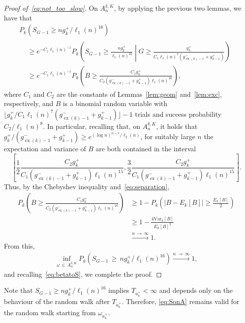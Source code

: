 \documentclass[AHL,Unicode,longabstracts,published]{cedram}
\newcommand{\relmiddle}[1]{\mathrel{}\middle#1\mathrel{}}
\newcommand{\cond}{\relmiddle{|}}
\newcommand{\Pk}{{P_k}}
\newcommand{\Ek}{{E_k}}
\newcommand\ex{\operatorname{ex}}
\newcommand{\gtt}[1]{g_{\ex(#1)-1}^-}
\begin{document}
\begin{proof}[Proof of~\eqref{eq:not_too_slow}]
On $A_n^{\delta,K}$, by applying the previous two lemmas, we have that
\begin{multline*}
\Pk\left(S_{G-1}\geq ng_k^+/\ell_1(n)^{16}\right)\\
\begin{aligned}
&\geq e^{-C_1\ell_1(n)^{-1}}\Pk\left(S_{G-1}\geq \frac{ng_k^+}{\ell_1(n)^{16}}\cond G\geq \frac{g_{k}^+}{C_1 \ell_1(n)^7\left(\gtt{k}+g_{k-1}^+\right)}\right)\\
&\geq e^{-C_1\ell_1(n)^{-1}}\Pk\left(B\geq \frac{C_1g_k^+}{C_2\left(\gtt{k}+g_{k-1}^+\right)\ell_1(n)^{16}}\right),
\end{aligned}
\end{multline*}
where $C_1$ and $C_2$ are the constants of Lemmas~\ref{lem:geom} and~\ref{lem:exc}, respectively, and $B$ is a binomial random variable with $\lfloor g_{k}^+ /C_1 \ell_1(n)^7(\gtt{k}+g_{k-1}^+)\rfloor-1$ trials and success probability ${C_2}/{\ell_1(n)^{8}}$. In particular, recalling that, on $A_n^{\delta,K}$, it holds that ${g_{k}^+}/(\gtt{k}+g_{k-1}^+)\geq e^{(\log n)^{\alpha-1}/\ell_2(n)}$, for suitably large $n$ the expectation and variance of $B$ are both contained in the interval
\[
\left[\frac 12\frac{C_2 g_{k}^+}{C_1\left(\gtt{k}+g_{k-1}^+\right) \ell_1(n)^{15}},\frac 32\frac{C_2 g_{k}^+}{C_1\left(\gtt{k}+g_{k-1}^+\right) \ell_1(n)^{15}}\right].
\]
Thus, by the Chebyshev inequality and~\eqref{eq:separation},
\begin{align*}
\Pk\left(B\geq \frac{C_1g_k^+}{C_2\left(\gtt{k}+g_{k-1}^+\right)\ell_1(n)^{16}}\right)&\geq 1-\Pk\left(\left|B-\Ek[B]\right|\geq \frac {\Ek[B]}2\right)\\
&\geq 1-\frac{4\text{Var}_k[B]}{\Ek[B]^2}\\
&\xrightarrow{n\,\to\,\infty}1.
\end{align*}
From this,
\begin{align}\label{eq:SonA}
\inf_{\omega\,\in\,A_n^{\delta,K}} \Pk\left(S_{G-1}\,\geq\,ng_k^+/\ell_1(n)^{16}\right)\xrightarrow{n\,\to\,\infty}1,
\end{align}
and recalling~\eqref{eq:betatoS}, we complete the proof.
\end{proof}

\begin{rema} \label{rem:SonA}
Note that $S_{G-1}\geq ng_k^+/\ell_1(n)^{16}$ implies $T_{{a_k^+}}<\infty$ and depends only on the behaviour of the random walk after $T_{{a_k^+}}$. Therefore, \eqref{eq:SonA} remains valid for the random walk starting from $\omega_{a_k^+}$.
\end{rema}
\end{document}
